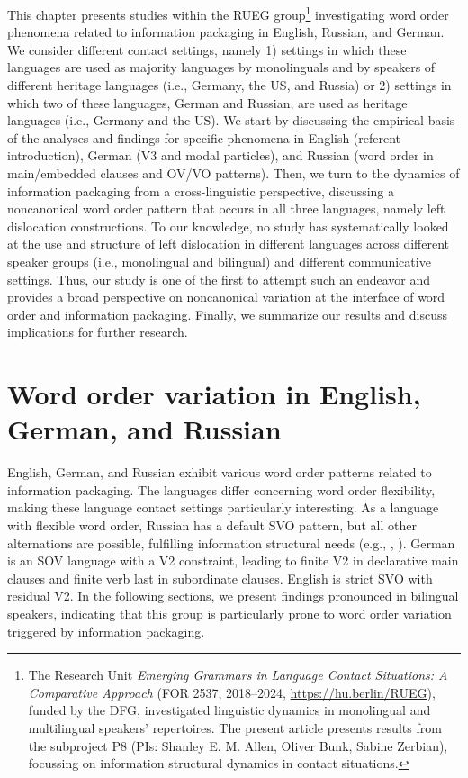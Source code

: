 \documentclass[output=paper,colorlinks,citecolor=brown]{langscibook}
\begin{document}
This chapter presents studies within the RUEG group\footnote{The Research Unit \textit{Emerging Grammars in Language Contact Situations: A Comparative Approach} (FOR 2537, 2018--2024, \url{https://hu.berlin/RUEG}), funded by the DFG, investigated linguistic dynamics in monolingual and multilingual speakers' repertoires. The present article presents results from the subproject P8 (PIs: Shanley E. M. Allen, Oliver Bunk, Sabine Zerbian), focussing on information structural dynamics in contact situations.} investigating word order phenomena related to information packaging in English, Russian, and German. We consider different contact settings, namely 1) settings in which these languages are used as majority languages by monolinguals and by speakers of different heritage languages (i.e., Germany, the US, and Russia) or 2) settings in which two of these languages, German and Russian, are used as heritage languages (i.e., Germany and the US). We start by discussing the empirical basis of the analyses and findings for specific phenomena in English (referent introduction), German (V3 and modal particles), and Russian (word order in main/embedded clauses and OV/VO patterns). Then, we turn to the dynamics of information packaging from a cross-linguistic perspective, discussing a noncanonical word order pattern that occurs in all three languages, namely left dislocation constructions. To our knowledge, no study has systematically looked at the use and structure of left dislocation in different languages across different speaker groups (i.e., monolingual and bilingual) and different communicative settings. Thus, our study is one of the first to attempt such an endeavor and provides a broad perspective on noncanonical variation at the interface of word order and information packaging. Finally, we summarize our results and discuss implications for further research.

\section{Word order variation in English, German, and Russian}
English, German, and Russian exhibit various word order patterns related to information packaging. The languages differ concerning word order flexibility, making these language contact settings particularly interesting. As a language with flexible word order, Russian has a default SVO pattern, but all other alternations are possible, fulfilling information structural needs (e.g., \cite{sirotinina_porjadok_2003, slioussar_grammar_2007}, \citeyear {slioussar_processing_2011}). German is an SOV language with a V2 constraint, leading to finite V2 in declarative main clauses and finite verb last in subordinate clauses. English is strict SVO with residual V2. In the following sections, we present findings pronounced in bilingual speakers, indicating that this group is particularly prone to word order variation triggered by information packaging.  
\end{document}
